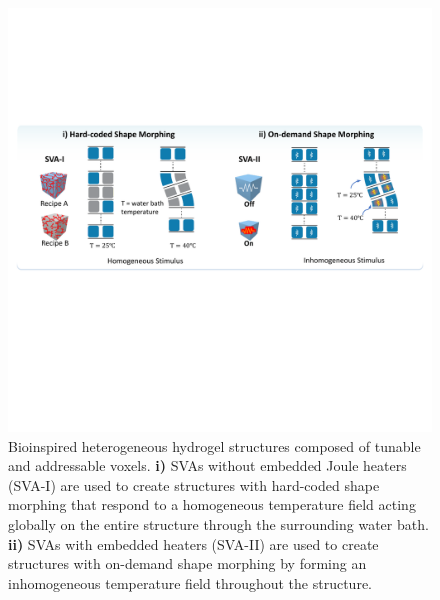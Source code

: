 \begin{figure}[!ht]
\centering
\includegraphics[width=\textwidth]{heterogeneous.pdf}
\caption[]{Bioinspired heterogeneous hydrogel structures composed of tunable and addressable voxels. \textbf{i)} SVAs without embedded Joule heaters (SVA-I) are used to create structures with hard-coded shape morphing that respond to a homogeneous temperature field acting globally on the entire structure through the surrounding water bath. \textbf{ii)} SVAs with embedded heaters (SVA-II) are used to create structures with on-demand shape morphing by forming an inhomogeneous temperature field throughout the structure.}
\label{fig:heterogeneous}
\end{figure}

